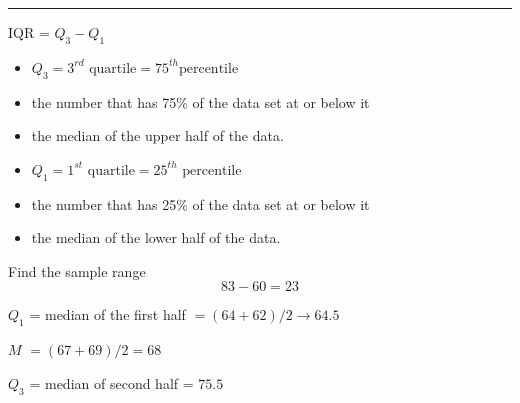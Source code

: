 \documentclass{report}
\begin{document}
\vspace{5mm}
\hrule
\vspace{3mm}

  \centerline{IQR = $Q_3 - Q_1$}
  \vspace{2mm}

\begin{itemize}
  \item $Q_3 = 3^{rd} \text{ quartile} = 75^{th} \text{percentile}$
  \item the number that has 75\% of the data set at or below it
  \item the median of the upper half of the data.
\end{itemize}
\vspace{3mm}

\begin{itemize}
  \item $Q_1 = 1^{st} \text{ quartile} = 25^{th} \text{ percentile}$
  \item the number that has 25\% of the data set at or below it
  \item the median of the lower half of the data.
\end{itemize}

\vspace{5mm}

\bigbreak \noindent
{} Find the sample range  $$83 - 60 = 23$$
\vspace{3mm}

\noindent{} $Q_1$ = median of the first half $=(64+ 62) / 2 \rightarrow 64.5$  

\vspace{2.5mm}
\hspace{-5mm}$M$ $ = (67 + 69) / 2 = 68$  
\vspace{2.5mm}

\hspace{-6mm} $Q_3$ = median of second half = $75.5$
\vspace{2.5mm}
\end{document}
